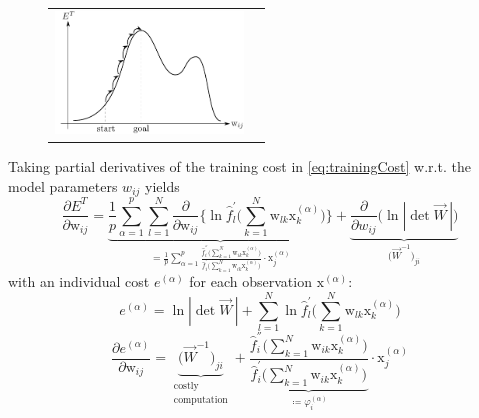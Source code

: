 \begin{figure}[h]
  \centering
  \begin{tabular}[c c]{c c}
   \includegraphics[width=5cm]{img/section2_fig17}
  &\raisebox{2cm}{$\Delta \mathrm{w}_{ij} = \underbrace{ \eta }_{
    \substack{ \text{learning} \\ \text{rate}} }
  \frac{\partial E^T}{\partial \mathrm{w}_{ij}}$}
  \end{tabular}  
  \label{fig:gradientDescent}
\end{figure}
\noindent Taking partial derivatives of the training cost in \eqref{eq:trainingCost} w.r.t. the model parameters $w_{ij}$ yields
\begin{equation}
	\frac{\partial E^T}{\partial \mathrm{w}_{ij}}
	= \underbrace{
    \frac{1}{p} \sum\limits_{\alpha = 1}^p 
		\sum\limits_{l = 1}^N \frac{\partial}{\partial \mathrm{w}_{ij}}
		\Bigg\{ \ln \widehat{f}_l^{'} \Bigg( \sum\limits_{k = 1}^N 
		\mathrm{w}_{lk} \mathrm{x}_k^{(\alpha)} \Bigg) \Bigg\}
        }_{ =
			\frac{1}{p} \sum\limits_{\alpha = 1}^p 
			\frac{ \widehat{f}_i^{''} \Big( \sum\limits_{k = 1}^N 
				\mathrm{w}_{ik} \mathrm{x}_k^{(\alpha)} \Big)
			}{\widehat{f}_i^{'} \Big( \sum\limits_{k = 1}^N 
			\mathrm{w}_{ik} \mathrm{x}_k^{(\alpha)} \Big)}
			\cdot \mathrm{x}_j^{(\alpha)} }
		+ \underbrace{ \frac{\partial}{\partial w_{ij}}
			\big( \ln |\det \vec{W}\,| \big) }_{
				\big( \vec{W}^{-1} \big)_{ji} }
\end{equation}
with an individual cost $e^{(\alpha)}$ for each observation $\mathrm{x}^{(\alpha)}$:
\begin{equation}
	e^{(\alpha)} = \ln |\det \vec{W}\,| + \sum\limits_{l = 1}^N \ln
		\widehat{f}_l^{'} \Bigg( \sum\limits_{k = 1}^N 
		\mathrm{w}_{lk} \mathrm{x}_k^{(\alpha)} \Bigg)
\end{equation}
\begin{equation}
	\frac{\partial e^{(\alpha)}}{\partial \mathrm{w}_{ij}}
	= \underbrace{ \big( \vec{W}^{-1} \big)_{ji} }_{
		\substack{ \text{costly} \\ \text{computation}} }
		+ \underbrace{  
			\frac{ \widehat{f}_i^{''} \bigg( \sum\limits_{k = 1}^N 
				\mathrm{w}_{ik} \mathrm{x}_k^{(\alpha)} \bigg)
			}{\widehat{f}_i^{'} \bigg( \sum\limits_{k = 1}^N 
			\mathrm{w}_{ik} \mathrm{x}_k^{(\alpha)} \bigg)}
			 }_{ \coloneqq \varphi_i^{(\alpha)} }
		\cdot \mathrm{x}_j^{(\alpha)}
\end{equation}
